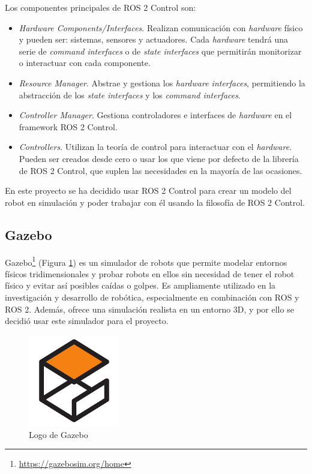 Los componentes principales de ROS 2 Control son:

\begin{itemize}
	\item \textit{Hardware Components/Interfaces}. Realizan comunicación con \textit{hardware} físico y pueden ser: sistemas, sensores y actuadores. Cada \textit{hardware} tendrá una serie de \textit{command interfaces} o de \textit{state interfaces} que permitirán monitorizar o interactuar con cada componente.
	\item \textit{Resource Manager}. Abstrae y gestiona los \textit{hardware interfaces}, permitiendo la abstracción de los \textit{state interfaces} y los \textit{command interfaces}.
	\item\textit{Controller Manager}. Gestiona controladores e interfaces de \textit{hardware} en el framework ROS 2 Control.
	\item \textit{Controllers}. Utilizan la teoría de control para interactuar con el \textit{hardware}. Pueden ser creados desde cero o usar los que viene por defecto de la librería de ROS 2 Control, que suplen las necesidades en la mayoría de las ocasiones.
\end{itemize}

En este proyecto se ha decidido usar ROS 2 Control para crear un modelo del robot en simulación y poder trabajar con él usando la filosofía de ROS 2 Control.


\subsection{Gazebo}
\label{subsec:gazebo}

Gazebo\footnote{\url{https://gazebosim.org/home}} (Figura \ref{fig:gazebo}) es un simulador de robots que permite modelar entornos físicos tridimensionales y probar robots en ellos sin necesidad de tener el robot físico y evitar así posibles caídas o golpes. Es ampliamente utilizado en la investigación y desarrollo de robótica, especialmente en combinación con ROS y ROS 2. Además, ofrece una simulación realista en un entorno 3D, y por ello se decidió usar este simulador para el proyecto.

\begin{figure} [h!]
	\begin{center}
		\includegraphics[width=4cm]{figs/gazebo.png}
	\end{center}
	\caption{Logo de Gazebo} %
	\label{fig:gazebo}
\end{figure}

